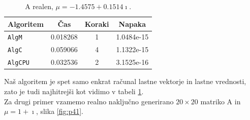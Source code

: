 \documentclass[12pt,a4paper]{amsart}
\theoremstyle{definition}
\theoremstyle{plain}
\begin{document}

\begin{table}[H]
\caption{A realen, $\mu = -1.4575 + 0.1514 \imath$.}
\begin{tabular}{|l|c|c|c|}
\hline
Algoritem & Čas & Koraki & Napaka\\
\hline
\hline
\verb+AlgM+ &0.018268&1&1.0484e-15\\
\hline
\verb+AlgC+ &0.059066 & 4& 1.1322e-15\\
\hline
\verb+AlgCPU+ &0.032536&2&3.1525e-16\\
\hline
\end{tabular}

\label{t3}
\end{table}
Naš algoritem je spet samo enkrat računal lastne vektorje in lastne vrednosti, zato je tudi najhitrejši kot vidimo v tabeli \ref{t3}.\\
Za drugi primer vzamemo realno naključno generirano $20\times 20$ matriko A in $\mu = 1 + \imath$, slika \ref{fig:p41}.
\end{document}
